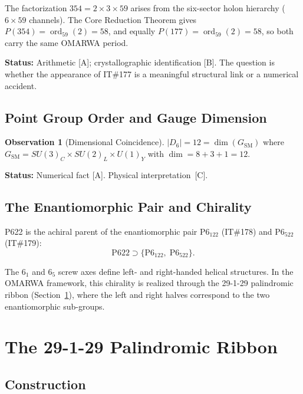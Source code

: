 \documentclass[11pt, a4paper]{article}
\theoremstyle{plain}
\theoremstyle{definition}
\newtheorem{observation}{Observation}[section]
\theoremstyle{remark}
\newcommand{\ord}{\operatorname{ord}}
\begin{document}
The factorization $354 = 2 \times 3 \times 59$ arises from the
six-sector holon hierarchy ($6 \times 59$ channels). The Core
Reduction Theorem gives $P(354) = \ord_{59}(2) = 58$, and equally
$P(177) = \ord_{59}(2) = 58$, so both carry the same OMARWA period.

\textbf{Status:} Arithmetic [A]; crystallographic identification [B].
The question is whether the appearance of IT\#177 is a meaningful
structural link or a numerical accident.

\subsection{Point Group Order and Gauge Dimension}

\begin{observation}[Dimensional Coincidence]
\label{obs:gauge}
$|D_6| = 12 = \dim(G_{\mathrm{SM}})$ where
$G_{\mathrm{SM}} = SU(3)_C \times SU(2)_L \times U(1)_Y$ with
$\dim = 8 + 3 + 1 = 12$.
\end{observation}

\textbf{Status:} Numerical fact [A]. Physical interpretation~[C].

\subsection{The Enantiomorphic Pair and Chirality}

P622 is the achiral parent of the enantiomorphic pair
P$6_122$ (IT\#178) and P$6_522$ (IT\#179):
\begin{equation}
\text{P622} \supset \{\text{P}6_122,\; \text{P}6_522\}.
\end{equation}

The $6_1$ and $6_5$ screw axes define left- and right-handed
helical structures. In the OMARWA framework, this chirality is
realized through the 29-1-29 palindromic ribbon (Section~\ref{sec:ribbon}),
where the left and right halves correspond to the two enantiomorphic
sub-groups.

\section{The 29-1-29 Palindromic Ribbon}
\label{sec:ribbon}

\subsection{Construction}
\end{document}
